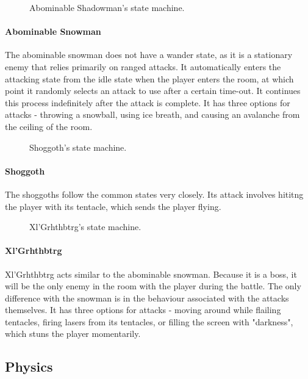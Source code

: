 \documentclass{article}
\begin{document}
\begin{figure}[h!]
{

}
\caption{Abominable Shadowman's state machine.}
\label{FSMSnowman}
\end{figure}

\paragraph{Abominable Snowman}
The abominable snowman does not have a wander state, as it is a stationary enemy that relies primarily on ranged attacks.  It automatically enters the attacking state from the idle state when the player enters the room, at which point it randomly selects an attack to use after a certain time-out.  It continues this process indefinitely after the attack is complete.  It has three options for attacks - throwing a snowball, using ice breath, and causing an avalanche from the ceiling of the room.

\begin{figure}[h!]
{

}
\caption{Shoggoth's state machine.}
\label{FSMShoggoth}
\end{figure}

\paragraph{Shoggoth}
The shoggoths follow the common states very closely.  Its attack involves hititng the player with its tentacle, which sends the player flying.

\begin{figure}[h!]
{

}
\caption{Xl'Grhthbtrg's state machine.}
\label{FSMBoss}
\end{figure}

\paragraph{Xl'Grhthbtrg}
Xl'Grhthbtrg acts similar to the abominable snowman.  Because it is a boss, it will be the only enemy in the room with the player during the battle.  The only difference with the snowman is in the behaviour associated with the attacks themselves.  It has three options for attacks - moving around while flailing tentacles, firing lasers from its tentacles, or filling the screen with "darkness", which stuns the player momentarily.

\subsection{Physics}
\end{document}

